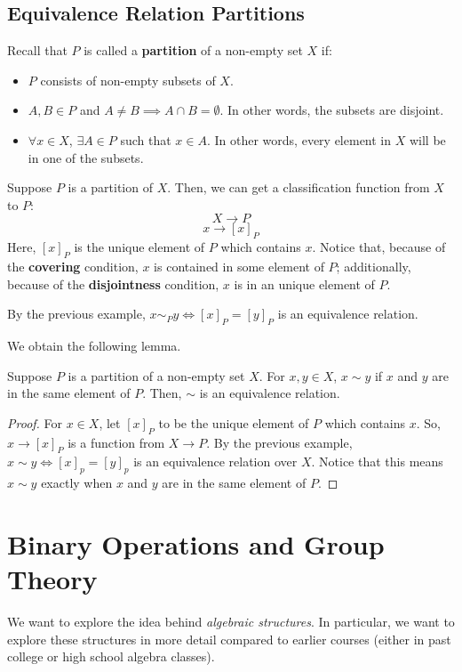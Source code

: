 \documentclass[letterpaper]{article}
\begin{document}
\subsection{Equivalence Relation Partitions}
Recall that $P$ is called a \textbf{partition} of a non-empty set $X$ if:
\begin{itemize}
    \item $P$ consists of non-empty subsets of $X$. 
    \item $A, B \in P$ and $A \neq B \implies A \cap B = \emptyset$. In other words, the subsets are disjoint. 
    \item $\forall x \in X$, $\exists A \in P$ such that $x \in A$. In other words, every element in $X$ will be in one of the subsets. 
\end{itemize}
Suppose $P$ is a partition of $X$. Then, we can get a classification function from $X$ to $P$:
\[X \to P\]
\[x \to [x]_P\]
Here, $[x]_P$ is the unique element of $P$ which contains $x$. Notice that, because of the \textbf{covering} condition, $x$ is contained in some element of $P$; additionally, because of the \textbf{disjointness} condition, $x$ is in an unique element of $P$. 

\bigskip 

By the previous example, $x \sim_P y \iff [x]_P = [y]_P$ is an equivalence relation. 

\bigskip 

We obtain the following lemma. 
\begin{lemma}{}{}
    Suppose $P$ is a partition of a non-empty set $X$. For $x, y \in X$, $x \sim y$ if $x$ and $y$ are in the same element of $P$. Then, $\sim$ is an equivalence relation.
\end{lemma}

\begin{proof}
    For $x \in X$, let $[x]_P$ to be the unique element of $P$ which contains $x$. So, $x \to [x]_P$ is a function from $X \to P$. By the previous example, $x \sim y \iff [x]_p = [y]_p$ is an equivalence relation over $X$. Notice that this means $x \sim y$ exactly when $x$ and $y$ are in the same element of $P$. 
\end{proof}


\newpage 
\section{Binary Operations and Group Theory}
We want to explore the idea behind \emph{algebraic structures}. In particular, we want to explore these structures in more detail compared to earlier courses (either in past college or high school algebra classes).
\end{document}
